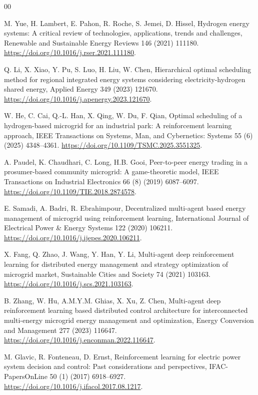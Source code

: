 \documentclass[final,5p,times]{elsarticle}
\begin{document}
\begin{thebibliography}{00}

M. Yue, H. Lambert, E. Pahon, R. Roche, S. Jemei, D. Hissel, Hydrogen energy systems: A critical review of technologies, applications, trends and challenges, Renewable and Sustainable Energy Reviews 146 (2021) 111180. \url{https://doi.org/10.1016/j.rser.2021.111180}.

Q. Li, X. Xiao, Y. Pu, S. Luo, H. Liu, W. Chen, Hierarchical optimal scheduling method for regional integrated energy systems considering electricity-hydrogen shared energy, Applied Energy 349 (2023) 121670. \url{https://doi.org/10.1016/j.apenergy.2023.121670}.

W. He, C. Cai, Q.-L. Han, X. Qing, W. Du, F. Qian, Optimal scheduling of a hydrogen-based microgrid for an industrial park: A reinforcement learning approach, IEEE Transactions on Systems, Man, and Cybernetics: Systems 55 (6) (2025) 4348--4361. \url{https://doi.org/10.1109/TSMC.2025.3551325}.

A. Paudel, K. Chaudhari, C. Long, H.B. Gooi, Peer-to-peer energy trading in a prosumer-based community microgrid: A game-theoretic model, IEEE Transactions on Industrial Electronics 66 (8) (2019) 6087--6097. \url{https://doi.org/10.1109/TIE.2018.2874578}.

E. Samadi, A. Badri, R. Ebrahimpour, Decentralized multi-agent based energy management of microgrid using reinforcement learning, International Journal of Electrical Power \& Energy Systems 122 (2020) 106211. \url{https://doi.org/10.1016/j.ijepes.2020.106211}.

X. Fang, Q. Zhao, J. Wang, Y. Han, Y. Li, Multi-agent deep reinforcement learning for distributed energy management and strategy optimization of microgrid market, Sustainable Cities and Society 74 (2021) 103163. \url{https://doi.org/10.1016/j.scs.2021.103163}.

B. Zhang, W. Hu, A.M.Y.M. Ghias, X. Xu, Z. Chen, Multi-agent deep reinforcement learning based distributed control architecture for interconnected multi-energy microgrid energy management and optimization, Energy Conversion and Management 277 (2023) 116647. \url{https://doi.org/10.1016/j.enconman.2022.116647}.

M. Glavic, R. Fonteneau, D. Ernst, Reinforcement learning for electric power system decision and control: Past considerations and perspectives, IFAC-PapersOnLine 50 (1) (2017) 6918--6927. \url{https://doi.org/10.1016/j.ifacol.2017.08.1217}.


\end{thebibliography}
\end{document}
